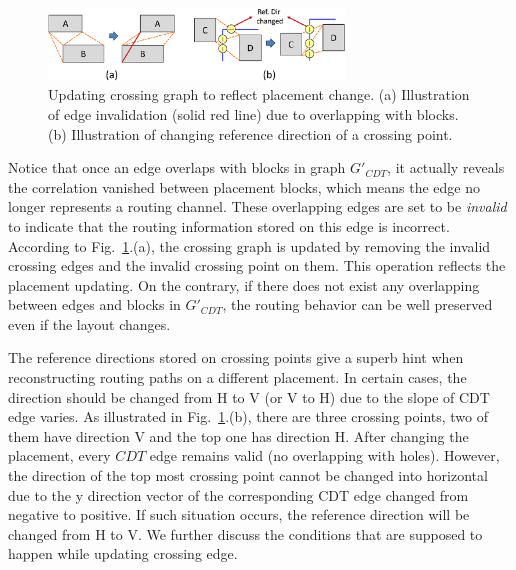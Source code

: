       \begin{figure}[ht]
        \begin{center}
        \includegraphics[width=0.7\textwidth]{Fig/Chapter4/updateG.eps}
        \caption{
          Updating crossing graph to reflect placement change.
          (a) Illustration of edge invalidation (solid red line) due to overlapping with blocks.
          (b) Illustration of changing reference direction of a crossing point.
          }
        \label{fig:updateG}
        \end{center}
      \end{figure}


      Notice that once an edge overlaps with blocks in graph $G'_{CDT}$, it actually reveals the correlation vanished between placement blocks, which means the edge no longer represents a routing channel. These overlapping edges are set to be {\it invalid} to indicate that the routing information stored on this edge is incorrect. According to Fig.~\ref{fig:updateG}.(a), the crossing graph is updated by removing the invalid crossing edges and the invalid crossing point on them. This operation reflects the placement updating. On the contrary, if there does not exist any overlapping between edges and blocks in $G'_{CDT}$, the routing behavior can be well preserved even if the layout changes.


      The reference directions stored on crossing points give a superb hint when reconstructing routing paths on a different placement.
      In certain cases, the direction should be changed from H to V (or V to H) due to the slope of CDT edge varies. As illustrated in Fig.~\ref{fig:updateG}.(b), there are three crossing points, two of them have direction V and the top one has direction H. After changing the placement, every $CDT$ edge remains valid (no overlapping with holes). However, the direction of the top most crossing point cannot be changed into horizontal due to the y direction vector of the corresponding CDT edge changed from negative to positive. If such situation occurs, the reference direction will be changed from H to V. We further discuss the conditions that are supposed to happen while updating crossing edge.

